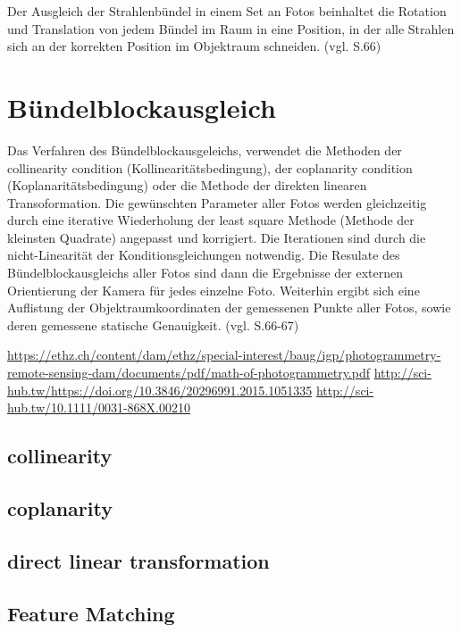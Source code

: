 Der Ausgleich der Strahlenbündel in einem Set an Fotos beinhaltet die Rotation und Translation von jedem Bündel im Raum in eine Position, in der alle Strahlen sich an der korrekten Position im Objektraum schneiden. (vgl. \cite{comparative_conditions_study} S.66)

\section{Bündelblockausgleich}

Das Verfahren des Bündelblockausgeleichs, verwendet die Methoden der \glqq collinearity condition \grqq{} (Kollinearitätsbedingung), der \glqq coplanarity condition\grqq{} (Koplanaritätsbedingung) oder die Methode der direkten linearen Transoformation. Die gewünschten Parameter aller Fotos werden gleichzeitig durch eine iterative Wiederholung der \glqq least square\grqq{} Methode (Methode der kleinsten Quadrate) angepasst und korrigiert. Die Iterationen sind durch die nicht-Linearität der Konditionsgleichungen notwendig. Die Resulate des Bündelblockausgleichs aller Fotos sind dann die Ergebnisse der externen Orientierung der Kamera für jedes einzelne Foto. Weiterhin ergibt sich eine Auflistung der Objektraumkoordinaten der gemessenen Punkte aller Fotos, sowie deren gemessene statische Genauigkeit. (vgl. \cite{comparative_conditions_study} S.66-67)

\url{https://ethz.ch/content/dam/ethz/special-interest/baug/igp/photogrammetry-remote-sensing-dam/documents/pdf/math-of-photogrammetry.pdf}
\url{http://sci-hub.tw/https://doi.org/10.3846/20296991.2015.1051335}
\url{http://sci-hub.tw/10.1111/0031-868X.00210}

\subsection{collinearity}

\subsection{coplanarity}

\subsection{direct linear transformation}

\subsection{Feature Matching}

